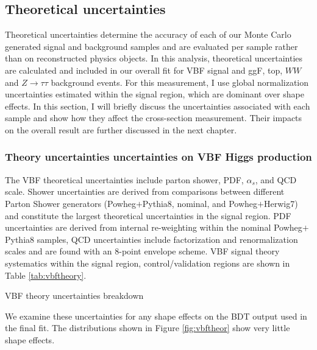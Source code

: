 \subsection{Theoretical uncertainties}
Theoretical uncertainties determine the accuracy of each of our Monte Carlo generated signal and background samples and are evaluated per sample rather than on reconstructed physics objects. In this analysis, theoretical uncertainties are calculated and included in our overall fit for VBF signal and ggF, top, $WW$ and $Z\rightarrow\tau\tau$ background events. For this measurement, I use global normalization uncertainties estimated within the signal region, which are dominant over shape effects. In this section, I will briefly discuss the uncertainties associated with each sample and show how they affect the cross-section measurement. Their impacts on the overall result are further discussed in the next chapter.  

\subsubsection{Theory uncertainties uncertainties on VBF Higgs production}
The VBF theoretical uncertainties include parton shower, PDF, $\alpha_s$, and QCD scale. Shower uncertainties are derived from comparisons between different Parton Shower generators (Powheg$+$Pythia8, nominal, and Powheg$+$Herwig7) and constitute the largest theoretical uncertainties in the signal region. PDF uncertainties are derived from internal re-weighting within the nominal Powheg$+$Pythia8 samples, QCD uncertainties include factorization and renormalization scales and are found with an 8-point envelope scheme. VBF signal theory systematics within the signal region, control/validation regions are shown in Table \ref{tab:vbftheory}.

\begin{table}[h!]
\centering
\scalebox{1.0}{

}
\caption{VBF theory uncertainties breakdown}
\label{tab:vbftheory}
\end{table}

We examine these uncertainties for any shape effects on the BDT output used in the final fit. The distributions shown in Figure \ref{fig:vbftheor} show very little shape effects.

